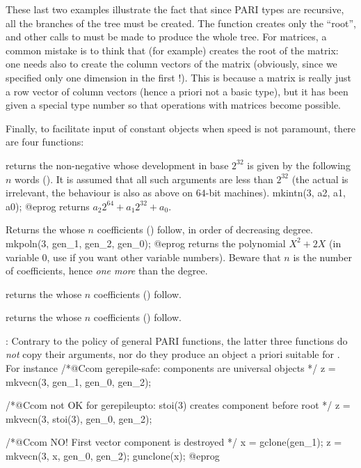 These last two examples illustrate the fact that since PARI types are
recursive, all the branches of the tree must be created. The function
 creates only the ``root'', and other calls to  must be
made to produce the whole tree. For matrices, a common mistake is to think
that  (for example) creates the root of the
matrix: one needs also to create the column vectors of the matrix (obviously,
since we specified only one dimension in the first !). This is
because a matrix is really just a row vector of column vectors (hence a
priori not a basic type), but it has been given a special type number so that
operations with matrices become possible.

Finally, to facilitate input of constant objects when speed is not paramount,
there are four  functions:

returns the non-negative  whose development in base $2^{32}$
is given by the following $n$ words (). It is assumed that
all such arguments are less than $2^{32}$ (the actual  is
irrelevant, the behaviour is also as above on $64$-bit machines).
\bprog
  mkintn(3, a2, a1, a0);
@eprog
\noindent returns $a_2 2^{64} + a_1 2^{32} + a_0$.

Returns the  whose $n$ coefficients () follow, in order of
decreasing degree.
\bprog
  mkpoln(3, gen_1, gen_2, gen_0);
@eprog
\noindent returns the polynomial $X^2 + 2X$ (in variable $0$, use
 if you want other variable numbers). Beware that $n$ is the
number of coefficients, hence \emph{one more} than the degree.

returns the  whose $n$ coefficients () follow.

returns the  whose $n$ coefficients () follow.

: Contrary to the policy of general PARI functions, the
latter three functions do \emph{not} copy their arguments, nor do they produce
an object a priori suitable for . For instance
\bprog
  /*@Ccom gerepile-safe: components are universal objects */
  z = mkvecn(3, gen_1, gen_0, gen_2);

  /*@Ccom not OK for gerepileupto: stoi(3) creates component before root */
  z = mkvecn(3, stoi(3), gen_0, gen_2);

  /*@Ccom NO! First vector component  is destroyed */
  x = gclone(gen_1);
  z = mkvecn(3, x, gen_0, gen_2);
  gunclone(x);
@eprog

